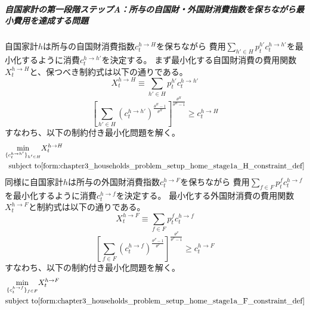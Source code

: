 \subparagraph{自国家計の第一段階ステップA：所与の自国財・外国財消費指数を保ちながら最小費用を達成する問題}
\label{sec:chapter3_households_problem_setup_home_stage1a}
自国家計\(h\)は所与の自国財消費指数\(c_t^{h\to H}\)を保ちながら
費用\(\sum_{h'\in H}p_t^{h'}c_t^{h\to h'}\)を最小化するように消費\(c_t^{h\to h'}\)を決定する。
まず最小化する自国財消費の費用関数\(X_t^{h\to H}\)と、保つべき制約式は以下の通りである。
\begin{equation}
\label{form:chapter3_households_problem_setup_home_stage1a_H_X_def}
    X_t^{h\to H}\equiv\sum_{h'\in H}p_t^{h'}c_t^{h\to h'}
\end{equation}
\begin{equation}
\label{form:chapter3_households_problem_setup_home_stage1a_H_constraint_def}
    \left[\sum_{h'\in H}(c_t^{h\to h'})^{\frac{\theta^H-1}{\theta^H}}\right]^{\frac{\theta^H}{\theta^H-1}}\ge c_t^{h\to H}
\end{equation}
すなわち、以下の制約付き最小化問題を解く。
\begin{equation}
\label{form:chapter3_households_problem_setup_home_stage1a_H_min_def}
    \begin{aligned}
        \min_{\{c_t^{h\to h'}\}_{h'\in H}}
        &X_t^{h\to H}\\
        \text{subject to}
        &\eqref{form:chapter3_households_problem_setup_home_stage1a_H_constraint_def}
    \end{aligned}
\end{equation}
同様に自国家計\(h\)は所与の外国財消費指数\(c_t^{h\to F}\)を保ちながら
費用\(\sum_{f\in F}p_t^{f}c_t^{h\to f}\)を最小化するように消費\(c_t^{h\to f}\)を決定する。
最小化する外国財消費の費用関数\(X_t^{h\to F}\)と制約式は以下の通りである。
\begin{equation}
\label{form:chapter3_households_problem_setup_home_stage1a_F_X_def}
    X_t^{h\to F}\equiv\sum_{f\in F}p_t^{f}c_t^{h\to f}
\end{equation}
\begin{equation}
\label{form:chapter3_households_problem_setup_home_stage1a_F_constraint_def}
    \left[\sum_{f\in F}(c_t^{h\to f})^{\frac{\theta^F-1}{\theta^F}}\right]^{\frac{\theta^F}{\theta^F-1}}\ge c_t^{h\to F}
\end{equation}
すなわち、以下の制約付き最小化問題を解く。
\begin{equation}
\label{form:chapter3_households_problem_setup_home_stage1a_F_min_def}
    \begin{aligned}
        \min_{\{c_t^{h\to f}\}_{f\in F}}
        &X_t^{h\to F}\\
        \text{subject to}
        &\eqref{form:chapter3_households_problem_setup_home_stage1a_F_constraint_def}
    \end{aligned}
\end{equation}

